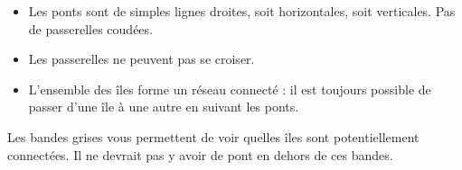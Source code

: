 {\begin{tcolorbox}[colback=white]
\begin{itemize}
\item Les ponts sont de simples lignes droites, soit horizontales, soit verticales. Pas de passerelles coudées.
\item Les passerelles ne peuvent pas se croiser.
\item L'ensemble des îles forme un réseau connecté : il est toujours possible de passer d'une île à une autre en suivant les ponts.
\end{itemize}

Les bandes grises vous permettent de voir quelles îles sont potentiellement connectées. Il ne devrait pas y avoir de pont en dehors de ces bandes.
\end{tcolorbox}
}















\newcommand{\techtonicRules}{
\begin{tcolorbox}[colback=white]
\begin{center}
\begin{Large}
\textbf{Techtonic}
\end{Large}
\end{center}

Complétez la grille avec les chiffres manquants dans chaque zone entourée de gras, sachant que :\begin{itemize}
\item une zone de deux cases contient les chiffres 1 et 2, une zone de 3 cases contient les chiffres 1, 2, 3, etc.
\item Un chiffre placé dans une case ne peut se retrouver dans aucune des cases qui l'entourent (en diagonale y compris)
\end{itemize}
\end{tcolorbox}
}

